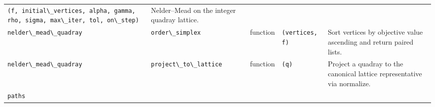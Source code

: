 \documentclass[
  10pt,
]{article}
\newcommand{\passthrough}[1]{#1}
\begin{document}
\begin{longtable}[]{@{}lllll@{}}
\begin{minipage}[t]{0.17\columnwidth}
\passthrough{\lstinline!(f, initial\_vertices, alpha, gamma, rho, sigma, max\_iter, tol, on\_step)!}\strut
\end{minipage} & \begin{minipage}[t]{0.17\columnwidth}\raggedright
Nelder--Mead on the integer quadray lattice.\strut
\end{minipage}\tabularnewline
\begin{minipage}[t]{0.17\columnwidth}\raggedright
\passthrough{\lstinline!nelder\_mead\_quadray!}\strut
\end{minipage} & \begin{minipage}[t]{0.17\columnwidth}\raggedright
\passthrough{\lstinline!order\_simplex!}\strut
\end{minipage} & \begin{minipage}[t]{0.17\columnwidth}\raggedright
function\strut
\end{minipage} & \begin{minipage}[t]{0.17\columnwidth}\raggedright
\passthrough{\lstinline!(vertices, f)!}\strut
\end{minipage} & \begin{minipage}[t]{0.17\columnwidth}\raggedright
Sort vertices by objective value ascending and return paired
lists.\strut
\end{minipage}\tabularnewline
\begin{minipage}[t]{0.17\columnwidth}\raggedright
\passthrough{\lstinline!nelder\_mead\_quadray!}\strut
\end{minipage} & \begin{minipage}[t]{0.17\columnwidth}\raggedright
\passthrough{\lstinline!project\_to\_lattice!}\strut
\end{minipage} & \begin{minipage}[t]{0.17\columnwidth}\raggedright
function\strut
\end{minipage} & \begin{minipage}[t]{0.17\columnwidth}\raggedright
\passthrough{\lstinline!(q)!}\strut
\end{minipage} & \begin{minipage}[t]{0.17\columnwidth}\raggedright
Project a quadray to the canonical lattice representative via
normalize.\strut
\end{minipage}\tabularnewline
\begin{minipage}[t]{0.17\columnwidth}\raggedright
\passthrough{\lstinline!paths!}\strut
\end{minipage} & \begin{minipage}[t]{0.17\columnwidth}\raggedright

\end{minipage}
\end{longtable}
\end{document}
